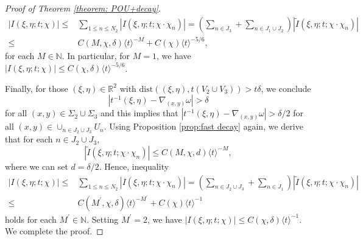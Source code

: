 \documentclass[12pt]{amsart}
\newcommand\JP[1]{\langle#1\rangle}
\newcommand{\R}{\mathbb{R}}
\begin{document}
\begin{proof}[Proof of Theorem \ref{theorem: POU+decay}]
\begin{equation*}
        \begin{aligned}
            \left|I\left(\xi,\eta;t;\chi\right)\right|\leq&\sum_{1\leq n\leq N_{2}}\left|I\left(\xi,\eta;t;\chi\cdot\chi_{n}\right)\right|=\left(\sum_{n\in J_{3}}+\sum_{n\in J_{1}\cup J_{2}}\right)\left|\widetilde{I}\left(\xi,\eta;t;\chi\cdot\chi_{n}\right)\right|\\
            \leq&C\left(M,\chi,\delta\right)\JP{t}^{-M}+C\left(\chi\right)\JP{t}^{-5/6},
        \end{aligned}
    \end{equation*}
    for each $M\in\mathbb{N}$. In particular, for $M=1$, we have $\left|I\left(\xi,\eta;t;\chi\right)\right|\leq C\left(\chi,\delta\right)\JP{t}^{-5/6}$. 

    Finally, for those $\left(\xi,\eta\right)\in \R^{2}$ with $\mathrm{dist}\left(\left(\xi,\eta\right),t\left(V_{2}\cup V_{3}\right)\right)>t\delta$, we conclude
    \begin{equation*}
        \left|t^{-1}\left(\xi,\eta\right)-\nabla_{\left(x,y\right)}\omega\right|>\delta
    \end{equation*}
    for all $\left(x,y\right)\in \Sigma_{2}\cup \Sigma_{3}$ and this implies that $\left|t^{-1}\left(\xi,\eta\right)-\nabla_{\left(x,y\right)}\omega\right|>\delta/2$ for all $\left(x,y\right)\in\cup_{n\in J_{2}\cup J_{3}}U_{n}$. Using Proposition \ref{prop:fast decay} again, we derive that for each $n\in J_{2}\cup J_{3}$, 
    \begin{equation*}
        \left|\widetilde{I}\left(\xi,\eta;t;\chi\cdot\chi_{n}\right)\right|\leq C\left(M,\chi,d\right)\JP{t}^{-M},
    \end{equation*}
    where we can set $d=\delta/2$. Hence, inequality
    \begin{equation*}
        \begin{aligned}
            \left|I\left(\xi,\eta;t;\chi\right)\right|\leq&\sum_{1\leq n\leq N_{2}}\left|I\left(\xi,\eta;t;\chi\cdot\chi_{n}\right)\right|=\left(\sum_{n\in J_{2}\cup J_{3}}+\sum_{n\in J_{1}}\right)\left|\widetilde{I}\left(\xi,\eta;t;\chi\cdot\chi_{n}\right)\right|\\
            \leq&C\left(M^{\prime},\chi,\delta\right)\JP{t}^{-M^{\prime}}+C\left(\chi\right)\JP{t}^{-1}
        \end{aligned}
    \end{equation*}
    holds for each $M^{\prime}\in\mathbb{N}$. Setting $M^{\prime}=2$, we have $\left|I\left(\xi,\eta;t;\chi\right)\right|\leq C\left(\chi,\delta\right)\JP{t}^{-1}$. We complete the proof.
\end{proof}
\end{document}
